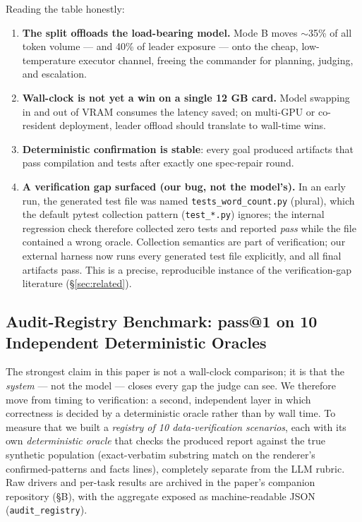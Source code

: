 \documentclass[11pt]{article}
\begin{document}
Reading the table honestly:
\begin{enumerate}
  \item \textbf{The split offloads the load-bearing model.} Mode B moves $\sim$35\% of all
        token volume --- and 40\% of leader exposure --- onto the cheap, low-temperature
        executor channel, freeing the commander for planning, judging, and escalation.
  \item \textbf{Wall-clock is not yet a win on a single 12 GB card.} Model swapping in
        and out of VRAM consumes the latency saved; on multi-GPU or co-resident
        deployment, leader offload should translate to wall-time wins.
  \item \textbf{Deterministic confirmation is stable}: every goal produced artifacts that
        pass compilation and tests after exactly one spec-repair round.
  \item \textbf{A verification gap surfaced (our bug, not the model's).} In an early run,
        the generated test file was named \texttt{tests\_word\_count.py} (plural), which
        the default pytest collection pattern (\texttt{test\_*.py}) ignores; the internal
        regression check therefore collected zero tests and reported \emph{pass} while the
        file contained a wrong oracle. Collection semantics are part of verification; our
        external harness now runs every generated test file explicitly, and all final
        artifacts pass. This is a precise, reproducible instance of the verification-gap
        literature (\S\ref{sec:related}).
\end{enumerate}

\subsection{Audit-Registry Benchmark: pass@1 on 10 Independent Deterministic Oracles}
The strongest claim in this paper is not a wall-clock comparison; it is that the
\emph{system} --- not the model --- closes every gap the judge can see. We therefore move
from timing to verification: a second, independent layer in which correctness is decided by
a deterministic oracle rather than by wall time. To measure that we built a
\emph{registry of 10 data-verification scenarios}, each with
its own \emph{deterministic oracle} that checks the produced report against the true
synthetic population (exact-verbatim substring match on the renderer's confirmed-patterns
and facts lines), completely separate from the LLM rubric. Raw drivers and per-task results
are archived in the paper's companion repository (\S B), with the aggregate exposed as
machine-readable JSON (\texttt{audit\_registry}).
\end{document}
